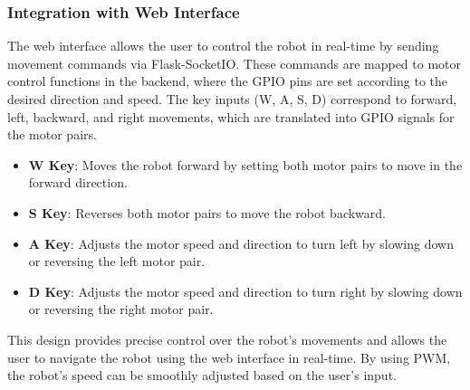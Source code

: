\subsubsection{Integration with Web Interface}

The web interface allows the user to control the robot in real-time by sending movement commands via Flask-SocketIO. These commands are mapped to motor control functions in the backend, where the GPIO pins are set according to the desired direction and speed. The key inputs (W, A, S, D) correspond to forward, left, backward, and right movements, which are translated into GPIO signals for the motor pairs.

\begin{itemize}
	\item \textbf{W Key}: Moves the robot forward by setting both motor pairs to move in the forward direction.
	\item \textbf{S Key}: Reverses both motor pairs to move the robot backward.
	\item \textbf{A Key}: Adjusts the motor speed and direction to turn left by slowing down or reversing the left motor pair.
	\item \textbf{D Key}: Adjusts the motor speed and direction to turn right by slowing down or reversing the right motor pair.
\end{itemize}

This design provides precise control over the robot’s movements and allows the user to navigate the robot using the web interface in real-time. By using PWM, the robot’s speed can be smoothly adjusted based on the user’s input.

